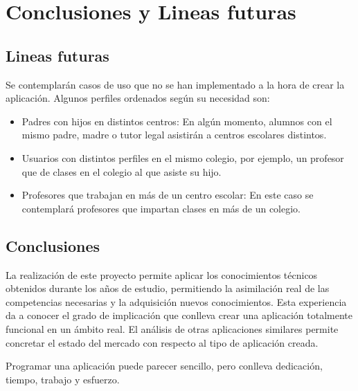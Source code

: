 %
%
%
%

\cleardoublepage
\chapter{Conclusiones y Lineas futuras}
\label{chap:conclusions}

	\section{Lineas futuras}
	
		Se contemplarán casos de uso que no se han implementado a la hora de crear la aplicación. Algunos perfiles ordenados según su necesidad son:
		
		\begin{itemize}
			\item Padres con hijos en distintos centros: En algún momento, alumnos con el mismo padre, madre o tutor legal asistirán a centros escolares distintos.
			\item Usuarios con distintos perfiles en el mismo colegio, por ejemplo, un profesor que de clases en el colegio al que asiste su hijo.
			\item Profesores que trabajan en más de un centro escolar: En este caso se contemplará profesores que impartan clases en más de un colegio.
		\end{itemize}
		
	\section{Conclusiones}
		La realización de este proyecto permite aplicar los conocimientos técnicos obtenidos durante los años de estudio, permitiendo la asimilación real de las competencias necesarias y la adquisición nuevos conocimientos.
		Esta experiencia da a conocer el grado de implicación que conlleva crear una aplicación totalmente funcional en un ámbito real. El análisis de otras aplicaciones similares permite concretar el estado del mercado con respecto al tipo de aplicación creada.
		
		\bigskip
		Programar una aplicación puede parecer sencillo, pero conlleva dedicación, tiempo, trabajo y esfuerzo.
